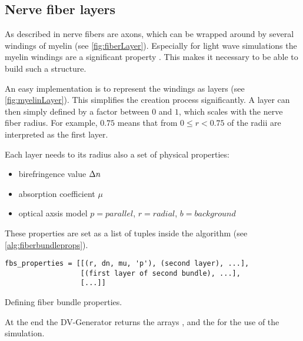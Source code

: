\subsection{Nerve fiber layers}
% 
As described in \dummy{} nerve fibers are axons, which can be wrapped around by several windings of myelin (see \cref{fig:fiberLayer}).
Especially for light wave simulations the myelin windings are a significant property \cite{MenzelDissertation}.
This makes it necessary to be able to build such a structure.
\par
% 
An easy implementation is to represent the windings as layers (see \cref{fig:myelinLayer}).
This simplifies the creation process significantly.
A layer can then simply defined by a factor between $0$ and $1$, which scales with the nerve fiber radius.
For example, $0.75$ means that from $0 \leq r < 0.75$ of the radii are interpreted as the first layer.
\par
% 
Each layer needs to its radius also a set of physical properties:
% 
\begin{itemize}[nosep]
    \item birefringence value $\textnormal{$\Delta n$}$
    \item absorption coefficient $\mu$
    \item optical axsis model $p=\mathit{parallel}$, $r=\mathit{radial}$, $b=\mathit{background}$
\end{itemize}
% 
These properties are set as a list of tuples inside the algorithm (see \cref{alg:fiberbundleprops}).
% 
\begin{lstfloat}[!ht]
\lstset{style=python}
\begin{lstlisting}[]
fbs_properties = [[(r, dn, mu, 'p'), (second layer), ...],
                  [(first layer of second bundle), ...],
                  [...]]
\end{lstlisting}
\caption[Fiber bundle properties]{Defining fiber bundle properties.}
\label{alg:fiberbundleprops}
\end{lstfloat}
% 
At the end the DV-Generator returns the arrays \tissue{}, \opticalaxis{} and the \propertylist{} for the use of the simulation.
% 

